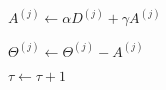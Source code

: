 \documentclass[12pt,notitlepage]{report}
\begin{document}
\begin{algorithmic}
      \vspace{10pt}
      \STATE {}
        \STATE $A^{(j)} \gets \alpha D^{(j)} + \gamma A^{(j)}$

        \STATE $\Theta^{(j)} \gets \Theta^{(j)} - A^{(j)}$
      \ENDFOR

      \vspace{10pt}

      \STATE $\tau \gets \tau + 1$


  \end{algorithmic}
\end{document}
